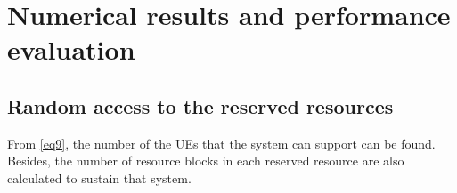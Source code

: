 \documentclass[conference]{IEEEtran}
\begin{document}

\section{Numerical results and performance evaluation}\label{III}

\subsection{Random access to the reserved resources}\label{IIIAA}
From \eqref{eq9}, the number of the UEs that the system can support can be found. Besides, the number of resource blocks in each reserved resource are also calculated to sustain that system.
\end{document}
